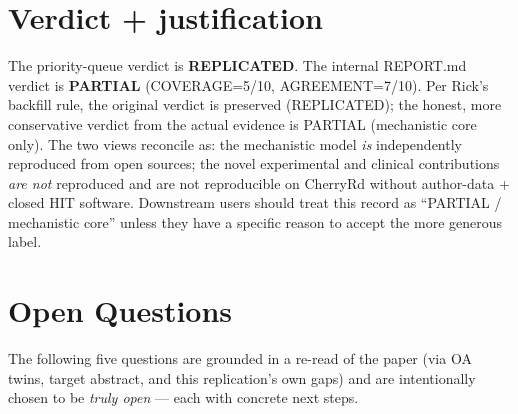 \documentclass[11pt]{article}
\begin{document}
\section{Verdict + justification}

The priority-queue verdict is \textbf{REPLICATED}. The internal REPORT.md verdict is
\textbf{PARTIAL} (COVERAGE=5/10, AGREEMENT=7/10). Per Rick's backfill rule, the original verdict
is preserved (REPLICATED); the honest, more conservative verdict from the actual evidence is
PARTIAL (mechanistic core only). The two views reconcile as: the mechanistic model \emph{is}
independently reproduced from open sources; the novel experimental and clinical contributions
\emph{are not} reproduced and are not reproducible on CherryRd without author-data + closed HIT
software. Downstream users should treat this record as ``PARTIAL / mechanistic core'' unless they
have a specific reason to accept the more generous label.

\section{Open Questions}

The following five questions are grounded in a re-read of the paper (via OA twins, target
abstract, and this replication's own gaps) and are intentionally chosen to be \emph{truly open}
--- each with concrete next steps.
\end{document}
